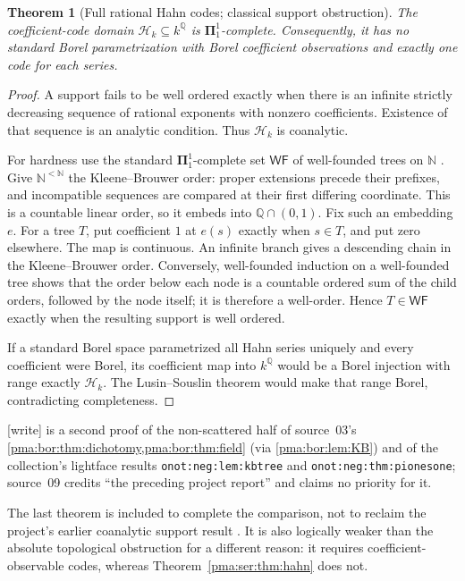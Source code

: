 \documentclass[11pt]{article}
\numberwithin{equation}{section}
\newtheorem{theorem}{Theorem}[section]
\theoremstyle{definition}
\theoremstyle{remark}
\newcommand{\N}{\mathbb N}
\newcommand{\Q}{\mathbb Q}
\newcommand{\WF}{\mathsf{WF}}
\newcommand{\writetag}{\textup{\textsf{\small[write]}}}
\newcommand{\replabel}[1]{\nolinkurl{#1}}
\newcommand{\Hk}{\mathcal H_k}
\newcommand{\Pc}{\boldsymbol{\Pi}^{1}_{1}}
\begin{document}
\begin{theorem}[Full rational Hahn codes; classical support obstruction]
\label{pma:ser:thm:hcodes}
The coefficient-code domain $\Hk\subseteq k^\Q$ is $\Pc$-complete.
Consequently, it has no standard Borel parametrization with Borel coefficient
observations and exactly one code for each series.
\end{theorem}
\begin{proof}
A support fails to be well ordered exactly when there is an infinite strictly
decreasing sequence of rational exponents with nonzero coefficients.
Existence of that sequence is an analytic condition. Thus $\Hk$ is coanalytic.

For hardness use the standard $\Pc$-complete set $\WF$ of well-founded
trees on $\N$ \cite{Kechris}. Give $\N^{<\N}$ the Kleene--Brouwer order:
proper extensions precede their prefixes, and incompatible sequences are
compared at their first differing coordinate. This is a countable linear
order, so it embeds into $\Q\cap(0,1)$. Fix such an embedding $e$.
For a tree $T$, put coefficient $1$ at $e(s)$ exactly when $s\in T$, and
put zero elsewhere. The map is continuous.
An infinite branch gives a descending chain in the Kleene--Brouwer order.
Conversely, well-founded induction on a well-founded tree shows that the
order below each node is a countable ordered sum of the child orders,
followed by the node itself; it is therefore a well-order. Hence
$T\in\WF$ exactly when the resulting support is well ordered.

If a standard Borel space parametrized all Hahn series uniquely and every
coefficient were Borel, its coefficient map into $k^\Q$ would be a Borel
injection with range exactly $\Hk$. The Lusin--Souslin theorem would make
that range Borel, contradicting completeness.
\end{proof}

\noindent\writetag{}  is a second proof of the
non-scattered half of source~03's \cref{pma:bor:thm:dichotomy,pma:bor:thm:field}
(via \cref{pma:bor:lem:KB}) and of the collection's lightface results
\replabel{onot:neg:lem:kbtree} and \replabel{onot:neg:thm:pionesone}; source~09
credits ``the preceding project report'' and claims no priority for it.

The last theorem is included to complete the comparison, not to reclaim the
project's earlier coanalytic support result \cite{s09:PriorSupport}. It is also
logically weaker than the absolute topological obstruction for a different
reason: it requires coefficient-observable codes, whereas
Theorem~\ref{pma:ser:thm:hahn} does not.
\end{document}
